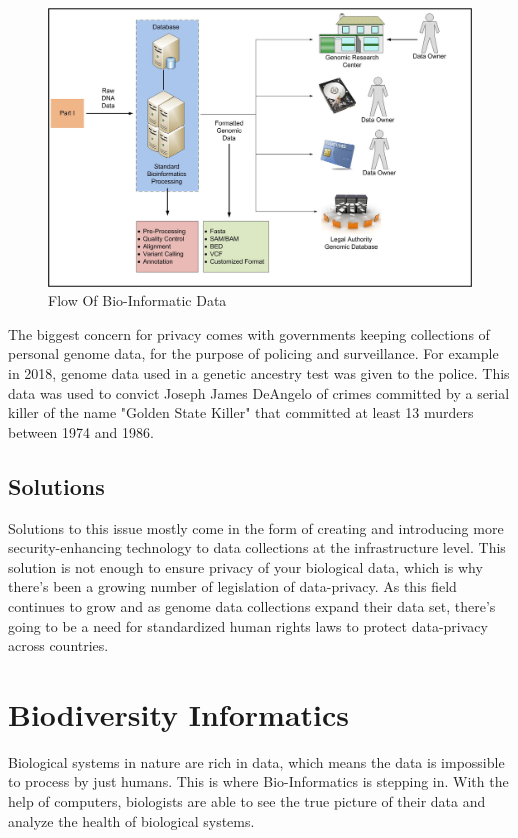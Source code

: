 \documentclass[12pt,journal,compsoc]{IEEEtran}
\begin{document}
\begin{figure}[H]
    \centering
    \includegraphics[width=\linewidth]{images/1-s2.0-S1532046415001100-gr2b_lrg.jpg}
    \caption{Flow Of Bio-Informatic Data}
    \label{fig:Flow Of Bio-Informatic Data}
\end{figure}

The biggest concern for privacy comes with governments keeping collections of personal genome data, for the purpose of policing and surveillance. For example in 2018, genome data used in a genetic ancestry test was given to the police. This data was used to convict Joseph James DeAngelo of crimes committed by a serial killer of the name "Golden State Killer" that committed at least 13 murders between 1974 and 1986.

\subsection{Solutions}
Solutions to this issue mostly come in the form of creating and introducing more security-enhancing technology to data collections at the infrastructure level. This solution is not enough to ensure privacy of your biological data, which is why there's been a growing number of legislation of data-privacy. As this field continues to grow and as genome data collections expand their data set, there's going to be a need for standardized human rights laws to protect data-privacy across countries.

\section{Biodiversity Informatics}
Biological systems in nature are rich in data, which means the data is impossible to process by just humans. This is where Bio-Informatics is stepping in. With the help of computers, biologists are able to see the true picture of their data and analyze the health of biological systems.
\end{document}
